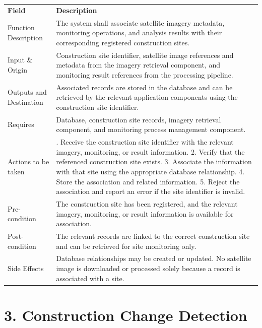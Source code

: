 \documentclass[12pt,a4paper]{report}
\begin{document}
\begin{longtable}[]{@{}
  >{\raggedright\arraybackslash}p{}
  >{\raggedright\arraybackslash}p{}@{}}
\toprule\noalign{}
\endhead
\bottomrule\noalign{}
\endlastfoot
\textbf{Field} & \textbf{Description} \\
Function Description & The system shall associate satellite imagery
metadata, monitoring operations, and analysis results with their
corresponding registered construction sites. \\
Input \& Origin & Construction site identifier, satellite image
references and metadata from the imagery retrieval component, and
monitoring result references from the processing pipeline. \\
Outputs and Destination & Associated records are stored in the database
and can be retrieved by the relevant application components using the
construction site identifier. \\
Requires & Database, construction site records, imagery retrieval
component, and monitoring process management component. \\
Actions to be taken & 1. Receive the construction site identifier with
the relevant imagery, monitoring, or result information. 2. Verify that
the referenced construction site exists. 3. Associate the information
with that site using the appropriate database relationship. 4. Store the
association and related information. 5. Reject the association and
report an error if the site identifier is invalid. \\
Pre-condition & The construction site has been registered, and the
relevant imagery, monitoring, or result information is available for
association. \\
Post-condition & The relevant records are linked to the correct
construction site and can be retrieved for site monitoring only. \\
Side Effects & Database relationships may be created or updated. No
satellite image is downloaded or processed solely because a record is
associated with a site. \\
\end{longtable}

\section{3. Construction Change
Detection}\label{construction-change-detection-1}
\end{document}
